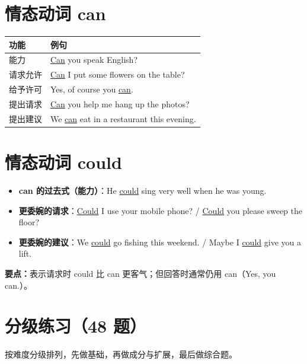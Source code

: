 \documentclass[11pt,a4paper]{ctexart}
\begin{document}
\section{情态动词 can}
\begin{center}
\begin{tabular}{p{3.0cm}p{10.4cm}}
\hline
\textbf{功能} & \textbf{例句}\\
\hline
能力 & \underline{Can} you speak English?\\
请求允许 & \underline{Can} I put some flowers on the table?\\
给予许可 & Yes, of course you \underline{can}.\\
提出请求 & \underline{Can} you help me hang up the photos?\\
提出建议 & We \underline{can} eat in a restaurant this evening.\\
\hline
\end{tabular}
\end{center}

\section{情态动词 could}
\begin{itemize}[leftmargin=1.4em]
\item \textbf{can 的过去式（能力）}：He \underline{could} sing very well when he was young.
\item \textbf{更委婉的请求}：\underline{Could} I use your mobile phone? / \underline{Could} you please sweep the floor?
\item \textbf{更委婉的建议}：We \underline{could} go fishing this weekend. / Maybe I \underline{could} give you a lift.
\end{itemize}
\textbf{要点：}表示请求时 could 比 can 更客气；但回答时通常仍用 can（Yes, you can.）。


\newpage
\section{分级练习（48 题）}
\noindent 按难度分级排列，先做基础，再做成分与扩展，最后做综合题。
\end{document}
